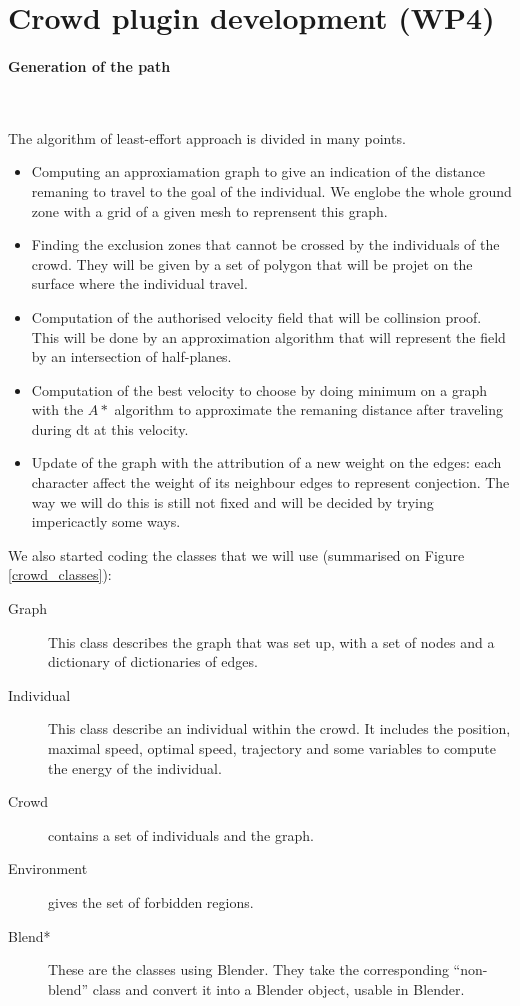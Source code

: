 \section{Crowd plugin development (WP4)}

\paragraph{Generation of the path}~

\noindent The algorithm of least-effort approach is divided in many points.
\begin{itemize}
  \item Computing an approxiamation graph to give an indication of the distance remaning to travel to the goal of the individual. We englobe the whole ground zone with a grid of a given mesh to reprensent this graph.
  \item Finding the exclusion zones that cannot be crossed by the individuals of the crowd. They will be given by a set of polygon that will be projet on the surface where the individual travel.
  \item Computation of the authorised velocity field that will be collinsion proof. This will be done by an approximation algorithm that will represent the field by an intersection of half-planes.
  \item Computation of the best velocity to choose by doing minimum on a graph with the $A*$ algorithm to approximate the remaning distance after traveling during dt at this velocity.
  \item Update of the graph with the attribution of a new weight on the edges: each character affect the weight of its neighbour edges to represent conjection. The way we will do this is still not fixed and will be decided by trying impericactly some ways.
\end{itemize}

\noindent We also started coding the classes that we will use (summarised on Figure \ref{crowd_classes}):
\begin{description}
  \item[Graph] This class describes the graph that was set up, with a set of nodes and a dictionary of dictionaries of edges.
  \item[Individual] This class describe an individual within the crowd. It includes the position, maximal speed, optimal speed, trajectory and some variables to compute the energy of the individual.
  \item[Crowd] contains a set of individuals and the graph.
  \item[Environment] gives the set of forbidden regions.
  \item[Blend*] These are the classes using Blender. They take the corresponding ``non-blend'' class and convert it into a Blender object, usable in Blender. 
\end{description}

